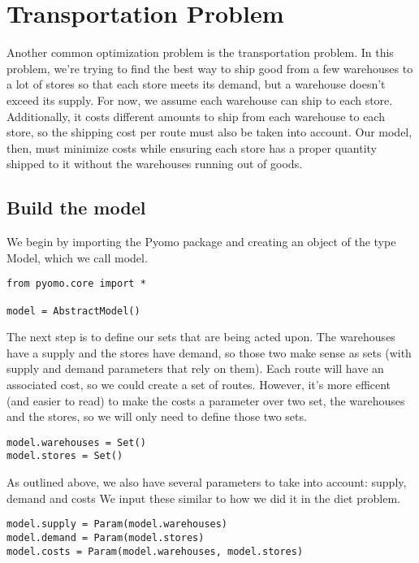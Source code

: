 \documentclass{article}
\begin{document}
\section*{Transportation Problem}

Another common optimization problem is the transportation problem.  In this problem, we're trying to find the best way to ship good from a few warehouses to a lot of stores so that each store meets its demand, but a warehouse doesn't exceed its supply.  For now, we assume each warehouse can ship to each store.  Additionally, it costs different amounts to ship from each warehouse to each store, so the shipping cost per route must also be taken into account.  Our model, then, must minimize costs while ensuring each store has a proper quantity shipped to it without the warehouses running out of goods.

\subsection*{Build the model}

We begin by importing the Pyomo package and creating an object of the type Model, which we call model.

\begin{verbatim}
from pyomo.core import *

model = AbstractModel()
\end{verbatim}

The next step is to define our sets that are being acted upon.  The warehouses have a supply and the stores have demand, so those two make sense as sets (with supply and demand parameters that rely on them).  Each route will have an associated cost, so we could create a set of routes.  However, it's more efficent (and easier to read) to make the costs a parameter over two set, the warehouses and the stores, so we will only need to define those two sets.

\begin{verbatim}
model.warehouses = Set()
model.stores = Set()
\end{verbatim}

As outlined above, we also have several parameters to take into account: supply, demand and costs  We input these similar to how we did it in the diet problem.

\begin{verbatim}
model.supply = Param(model.warehouses)
model.demand = Param(model.stores)
model.costs = Param(model.warehouses, model.stores)
\end{verbatim}
\end{document}
